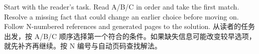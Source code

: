 \documentclass[10pt,twoside]{article}
\begin{document}
 {Start with the reader's task. Read A/B/C in order and take the first match. Resolve a missing fact that could change an earlier choice before moving on. Follow N-numbered references and generated pages to the solution.}
 {从读者的任务出发，按 A/B/C 顺序选择第一个符合的条件。如果缺失信息可能改变较早选项，就先补齐再继续。按 N 编号与自动页码查找解法。}
\StudyExampleDecisions
\end{document}
